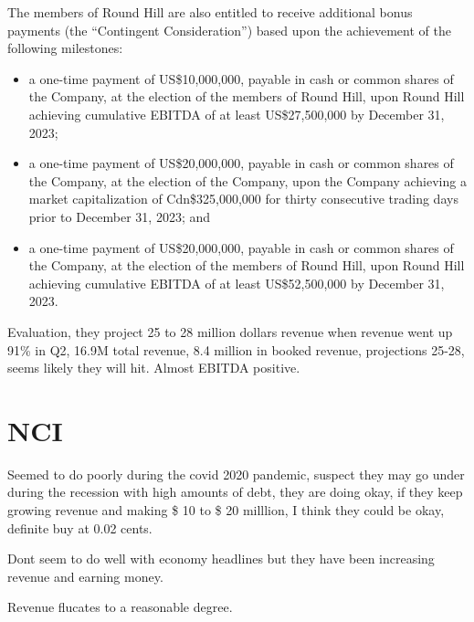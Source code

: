 The members of Round Hill are also entitled to receive additional bonus payments (the “Contingent
Consideration”) based upon the achievement of the following milestones:
\begin{itemize}
\item a one-time payment of US\$10,000,000, payable in cash or common shares of the Company, at the
election of the members of Round Hill, upon Round Hill achieving cumulative EBITDA of at least
US\$27,500,000 by December 31, 2023;
\item a one-time payment of US\$20,000,000, payable in cash or common shares of the Company, at the
election of the Company, upon the Company achieving a market capitalization of Cdn\$325,000,000
for thirty consecutive trading days prior to December 31, 2023; and
\item a one-time payment of US\$20,000,000, payable in cash or common shares of the Company, at the
election of the members of Round Hill, upon Round Hill achieving cumulative EBITDA of at least
US\$52,500,000 by December 31, 2023.
\end{itemize}


Evaluation, they project 25 to 28 million dollars revenue when revenue went up 91\% in Q2, 16.9M total revenue, 8.4 million in booked revenue, projections 25-28, seems likely they will hit. Almost EBITDA positive.


\section{NCI}

Seemed to do poorly during the covid 2020 pandemic, suspect they may go under during the recession with high amounts of debt, they are doing okay, if they keep growing revenue and making \$ 10 to \$ 20 milllion, I think they could be okay, definite buy at 0.02 cents.

Dont seem to do well with economy headlines but they have been increasing revenue and earning money.

Revenue flucates to a reasonable degree.

